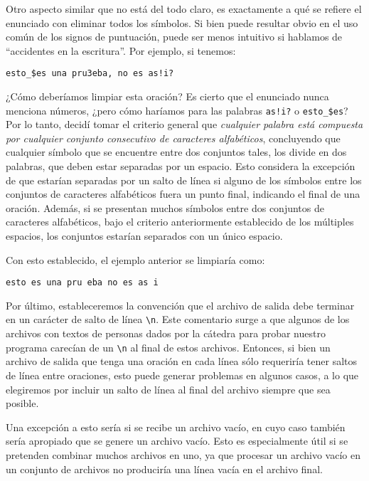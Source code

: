 \documentclass[a4paper]{article}
\begin{document}
Otro aspecto similar que no está del todo claro, es exactamente a qué se refiere el enunciado con eliminar todos los símbolos. Si bien puede resultar obvio en el uso común de los signos de puntuación, puede ser menos intuitivo si hablamos de ``accidentes en la escritura''. Por ejemplo, si tenemos:

\begin{tcolorbox}
    \texttt{esto\_\$es una pru3eba, no es as!i?}
\end{tcolorbox}

¿Cómo deberíamos limpiar esta oración? Es cierto que el enunciado nunca menciona números, ¿pero cómo haríamos para las palabras \texttt{as!i?} o \texttt{esto\_\$es}? Por lo tanto, decidí tomar el criterio general que \textit{cualquier palabra está compuesta por cualquier conjunto consecutivo de caracteres alfabéticos}, concluyendo que cualquier símbolo que se encuentre entre dos conjuntos tales, los divide en dos palabras, que deben estar separadas por un espacio. Esto considera la excepción de que estarían separadas por un salto de línea si alguno de los símbolos entre los conjuntos de caracteres alfabéticos fuera un punto final, indicando el final de una oración. Además, si se presentan muchos símbolos entre dos conjuntos de caracteres alfabéticos, bajo el criterio anteriormente establecido de los múltiples espacios, los conjuntos estarían separados con un único espacio.

Con esto establecido, el ejemplo anterior se limpiaría como:

\begin{tcolorbox}
    \texttt{esto es una pru eba no es as i}
\end{tcolorbox}

\vspace{10pt}

Por último, estableceremos la convención que el archivo de salida debe terminar en un carácter de salto de línea \texttt{\textbackslash{}n}. Este comentario surge a que algunos de los archivos con textos de personas dados por la cátedra para probar nuestro programa carecían de un \texttt{\textbackslash{}n} al final de estos archivos. Entonces, si bien un archivo de salida que tenga una oración en cada línea sólo requeriría tener saltos de línea entre oraciones, esto puede generar problemas en algunos casos\cite{NewlineStackoverflow}, a lo que elegiremos por incluir un salto de línea al final del archivo siempre que sea posible.

Una excepción a esto sería si se recibe un archivo vacío, en cuyo caso también sería apropiado que se genere un archivo vacío. Esto es especialmente útil si se pretenden combinar muchos archivos en uno, ya que procesar un archivo vacío en un conjunto de archivos no produciría una línea vacía en el archivo final.
\end{document}
